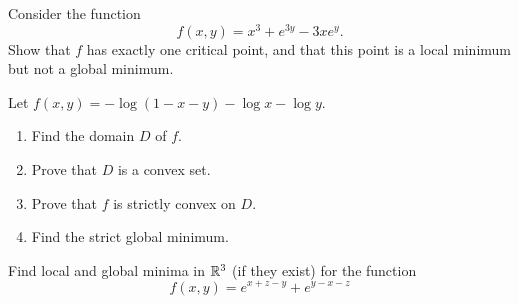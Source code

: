 \begin{problem}[Intermediate]\cite[p.36 \#33]{peressini1988mathematics}
Consider the function
\begin{equation*}
f(x,y) = x^3 + e^{3y} -3xe^y.
\end{equation*}
Show that $f$ has exactly one critical point, and that this point is a local minimum but not a global minimum.
\end{problem}

\begin{problem}[Basic]
Let $f(x,y) = -\log(1-x-y)-\log x -\log y$.
\begin{enumerate}
	\item Find the domain $D$ of $f$.
	\item Prove that $D$ is a convex set.
	\item Prove that $f$ is strictly convex on $D$.
	\item Find the strict global minimum.
\end{enumerate}
\end{problem}

\begin{problem}[Basic]\cite[p.81 \#27]{peressini1988mathematics}
Find local and global minima in $\mathbb{R}^3$ (if they exist) for the function 
\begin{equation*}
f(x,y) = e^{x+z-y}+e^{y-x-z}
\end{equation*}
\end{problem}


